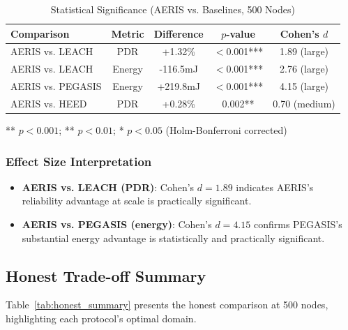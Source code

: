 \begin{table}[htbp]
\centering
\caption{Statistical Significance (AERIS vs. Baselines, 500 Nodes)}
\label{tab:significance}
\begin{tabular}{@{}lcccc@{}}
\toprule
Comparison & Metric & Difference & $p$-value & Cohen's $d$ \\
\midrule
AERIS vs. LEACH & PDR & +1.32\% & $<$0.001*** & 1.89 (large) \\
AERIS vs. LEACH & Energy & -116.5mJ & $<$0.001*** & 2.76 (large) \\
AERIS vs. PEGASIS & Energy & +219.8mJ & $<$0.001*** & 4.15 (large) \\
AERIS vs. HEED & PDR & +0.28\% & 0.002** & 0.70 (medium) \\
\bottomrule
\end{tabular}
\begin{tablenotes}
\small
\item *** $p < 0.001$; ** $p < 0.01$; * $p < 0.05$ (Holm-Bonferroni corrected)
\end{tablenotes}
\end{table}

\subsubsection{Effect Size Interpretation}

\begin{itemize}
    \item \textbf{AERIS vs. LEACH (PDR)}: Cohen's $d = 1.89$ indicates
    AERIS's reliability advantage at scale is practically significant.

    \item \textbf{AERIS vs. PEGASIS (energy)}: Cohen's $d = 4.15$ confirms
    PEGASIS's substantial energy advantage is statistically and practically
    significant.
\end{itemize}

\subsection{Honest Trade-off Summary}

Table~\ref{tab:honest_summary} presents the honest comparison at 500 nodes,
highlighting each protocol's optimal domain.

